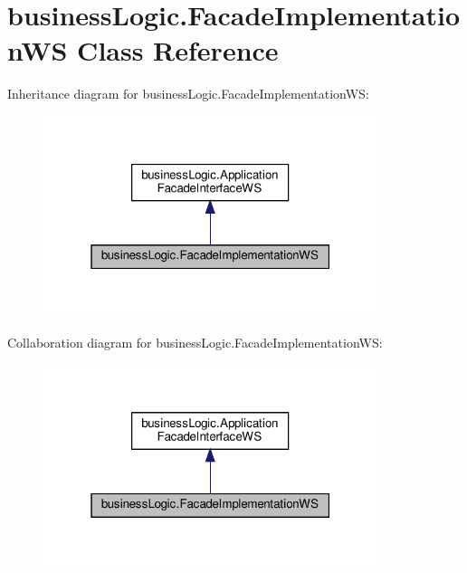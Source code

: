\hypertarget{classbusiness_logic_1_1_facade_implementation_w_s}{}\section{business\+Logic.\+Facade\+Implementation\+WS Class Reference}
\label{classbusiness_logic_1_1_facade_implementation_w_s}


Inheritance diagram for business\+Logic.\+Facade\+Implementation\+WS\+:
\nopagebreak
\begin{figure}[H]
\begin{center}
\leavevmode
\includegraphics[width=277pt]{classbusiness_logic_1_1_facade_implementation_w_s__inherit__graph}
\end{center}
\end{figure}


Collaboration diagram for business\+Logic.\+Facade\+Implementation\+WS\+:
\nopagebreak
\begin{figure}[H]
\begin{center}
\leavevmode
\includegraphics[width=277pt]{classbusiness_logic_1_1_facade_implementation_w_s__coll__graph}
\end{center}
\end{figure}
